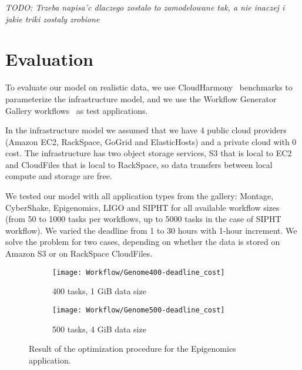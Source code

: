 {    \emph{TODO: Trzeba napisa'c dlaczego zostalo to zamodelowane tak, a nie inaczej i jakie triki zostaly zrobione}
    
    
    \section{Evaluation}
    \label{sec:workflow:evaluation}

    To evaluate our model on realistic data, we use CloudHarmony~\cite{CloudHarmony}
    benchmarks to parameterize the infrastructure model, and we use the Workflow
    Generator Gallery workflows~\cite{Bharathi08} as test applications.

    In the infrastructure model we assumed that we have 4 public cloud providers
    (Amazon EC2, RackSpace, GoGrid and ElasticHosts) and a private cloud with 0
    cost. The infrastructure has two object storage services, S3 that is local to EC2 and
    CloudFiles that is local to RackSpace, so data transfers between local compute
    and storage are free. 

    We tested our model with all application types from the gallery: Montage,
    CyberShake, Epigenomics, LIGO and SIPHT for all available workflow sizes
    (from 50 to 1000 tasks per workflows, up to 5000 tasks in the case of SIPHT
    workflow). We varied the deadline from 1 to 30 hours with 1-hour increment. We
    solve the problem for two cases, depending on whether the data is stored on Amazon S3 or
    on RackSpace CloudFiles.
  
    \begin{figure}[b] 
       \centering
       \begin{subfigure}[b]{0.49\textwidth}  
         \texttt{[image: Workflow/Genome400-deadline\_cost]}
         \caption{400 tasks, 1 GiB data size}
         \label{fig:genome-400}
       \end{subfigure}
       \begin{subfigure}[b]{0.49\textwidth}
         \texttt{[image: Workflow/Genome500-deadline\_cost]}
         \caption{500 tasks, 4 GiB data size}
         \label{fig:genome-500}
       \end{subfigure}
       \caption{\label{fig:genome}Result of the optimization procedure for the Epigenomics application.}
    \end{figure}  

}
